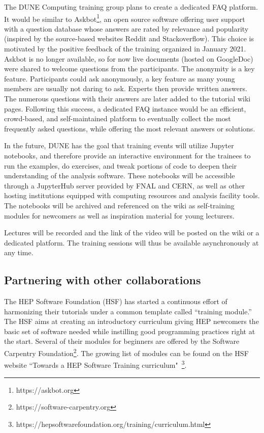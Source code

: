 The DUNE Computing training group plans to create a dedicated FAQ platform. It would be similar to  Askbot\footnote{https://askbot.org}, an open source software offering user support with a question database whose answers are rated by relevance and popularity (inspired by the source-based websites Reddit and Stackoverflow). This choice is motivated by the positive feedback of the training organized in January 2021. Askbot is no longer available, so for now live documents (hosted on GoogleDoc) were shared to welcome questions from the participants. The anonymity is a key feature. Participants could ask anonymously, a key feature as many young members are usually not daring to ask. Experts then provide written answers. The numerous questions with their answers are later added to the tutorial wiki pages. Following this success, a dedicated FAQ instance would be an efficient, crowd-based, and self-maintained platform to eventually collect the most frequently asked questions, while offering the most relevant answers or solutions.

In the future, DUNE has the goal that training events will utilize Jupyter notebooks, and therefore provide an interactive environment for the trainees to run the examples, do exercises, and tweak portions of code to deepen their understanding of the analysis software. These notebooks will be accessible through a JupyterHub server provided by FNAL and CERN, as well as other hosting institutions equipped with computing resources and analysis facility tools. The notebooks will be archived and referenced on the wiki as self-training modules for newcomers as well as inspiration material for young lecturers.

Lectures will be recorded and the link of the video will be posted on the wiki or a dedicated platform. The training sessions will thus be available asynchronously at any time.

\subsection{Partnering with other collaborations}
The HEP Software Foundation (HSF) has started a continuous effort of harmonizing their tutorials under a common template called “training module.” The HSF aims at creating an introductory curriculum giving HEP newcomers the basic set of software needed while instilling good programming practices right at the start. Several of their modules for beginners are offered by the Software Carpentry Foundation\footnote{https://software-carpentry.org }. The growing list of modules can be found on the HSF website “Towards a HEP Software Training curriculum"~\footnote{https://hepsoftwarefoundation.org/training/curriculum.html}.

